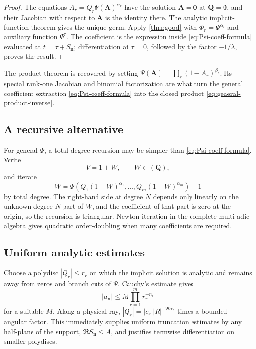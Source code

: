 \documentclass[11pt,oneside]{article}
\numberwithin{equation}{section}
\theoremstyle{plain}
\theoremstyle{definition}
\theoremstyle{remark}
\newcommand{\multi}[1]{\bm{#1}}
\begin{document}
\begin{proof}
The equations
\(
 A_r=Q_r\Psi(\multi A)^{\alpha_r}
\)
have the solution \(\multi A=\multi0\) at \(\multi Q=\multi0\), and their
Jacobian with respect to \(\multi A\) is the identity there.  The analytic
implicit-function theorem gives the unique germ.  Apply
\cref{thm:good} with
\(
 \Phi_r=\Psi^{\alpha_r}
\) and auxiliary function \(\Psi^\tau\).  The coefficient is the expression
inside \cref{eq:Psi-coeff-formula} evaluated at
\(t=\tau+S_{\multi n}\); differentiation at \(\tau=0\), followed by the
factor \(-1/\lambda\), proves the result.
\end{proof}

The product theorem is recovered by setting
\(
 \Psi(\multi A)=\prod_r(1-A_r)^{\beta_r}
\).  Its special rank-one Jacobian and binomial factorization are what turn
the general coefficient extraction \cref{eq:Psi-coeff-formula} into the
closed product \cref{eq:general-product-inverse}.

\subsection{A recursive alternative}

For general \(\Psi\), a total-degree recursion may be simpler than
\cref{eq:Psi-coeff-formula}.  Write
\[
 V=1+W,
 \qquad W\in(\multi Q),
\]
and iterate
\begin{equation}\label{eq:Psi-picard}
 W=\Psi\!\left(Q_1(1+W)^{\alpha_1},\ldots,
 Q_m(1+W)^{\alpha_m}\right)-1
\end{equation}
by total degree.  The right-hand side at degree \(N\) depends only linearly
on the unknown degree-\(N\) part of \(W\), and the coefficient of that part
is zero at the origin, so the recursion is triangular.  Newton iteration in
the complete multi-adic algebra gives quadratic order-doubling when many
coefficients are required.

\subsection{Uniform analytic estimates}

Choose a polydisc \(|Q_r|\le r_r\) on which the implicit solution is
analytic and remains away from zeros and branch cuts of \(\Psi\).  Cauchy's
estimate gives
\begin{equation}\label{eq:multi-Cauchy}
 |a_{\multi n}|\le M\prod_{r=1}^mr_r^{-n_r}
\end{equation}
for a suitable \(M\).  Along a physical ray,
\(|Q_r|=|c_r||R|^{-\Re\alpha_r}\) times a bounded angular factor.  This
immediately supplies uniform truncation estimates by any half-plane of the
support,
\(
 \Re S_{\multi n}\le A
\), and justifies termwise differentiation on smaller polydiscs.
\end{document}

